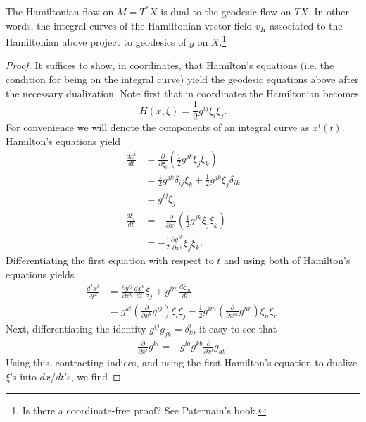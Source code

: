 \documentclass{amsart}
\begin{document}
\begin{proposition}
    The Hamiltonian flow on $M=T^*X$ is dual to the geodesic flow on $TX$. In other words, the integral
    curves of the Hamiltonian vector field $v_H$ associated to the Hamiltonian above project to geodesics
    of $g$ on $X$.\footnote{Is there a coordinate-free proof? See Paternain's book.}
\end{proposition}
\begin{proof}
    It suffices to show, in coordinates, that Hamilton's equations (i.e. the condition for
    being on the integral curve) yield the geodesic equations above after the necessary
    dualization. Note first that in coordinates the Hamiltonian becomes
    \begin{equation*}
        H(x,\xi) = \frac{1}{2}g^{ij}\xi_i\xi_j.
    \end{equation*}
    For convenience we will denote the components of an integral curve as $x^i(t)$. Hamilton's equations yield
    \begin{align*}
        \frac{dx^i}{dt} &= \frac{\partial}{\partial\xi_i}\left( \frac{1}{2}g^{jk}\xi_j\xi_k \right)\\
        &= \frac{1}{2}g^{jk}\delta_{ij}\xi_k + \frac{1}{2}g^{jk}\xi_j\delta_{ik}\\
        &= g^{ij}\xi_j\\
        \frac{d\xi_i}{dt} &= -\frac{\partial}{\partial x^i}\left( \frac{1}{2}g^{jk}\xi_j\xi_k \right)\\
        &=-\frac{1}{2}\frac{\partial g^{jk}}{\partial x^i}\xi_j\xi_k.
    \end{align*}
    Differentiating the first equation with respect to $t$ and using both of Hamilton's equations yields
    \begin{align*}
        \frac{d^2x^i}{dt^2} &= \frac{\partial g^{ij}}{\partial x^k}\frac{dx^k}{dt}\xi_j+g^{im}\frac{d\xi_m}{dt}\\
        &= g^{kl}\left(\frac{\partial}{\partial x^k}g^{ij}\right)\xi_l\xi_j-\frac{1}{2}g^{im}\left(\frac{\partial}{\partial x^m}g^{nr}\right)\xi_n\xi_r.
    \end{align*}
    Next, differentiating the identity $g^{ij}g_{jk}=\delta^i_k$, it easy to see that
    \begin{align*}
        \frac{\partial}{\partial x^i}g^{kl}=-g^{la}g^{kb}\frac{\partial}{\partial x^i}g_{ab}.
    \end{align*}
    Using this, contracting indices, and using the first Hamilton's equation to dualize $\xi$'s into $dx/dt$'s,
    we find

\end{proof}
\end{document}
